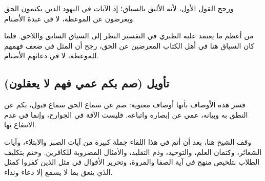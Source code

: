 ورجح القول الأول، لأنه الأليق بالسياق؛ إذ الآيات في اليهود الذين يكتمون الحق ويعرضون عن الموعظة، لا في عبدة الأصنام.

\begin{fawaid}
من أعظم ما يعتمد عليه الطبري في التفسير النظر إلى السياق السابق واللاحق. فلما كان السياق هنا في أهل الكتاب المعرضين عن الحق، رجح أن المثل في ضعف فهمهم للموعظة، لا في دعائهم الأصنام.
\end{fawaid}

\subsection{تأويل (صم بكم عمي فهم لا يعقلون)}
فسر  هذه الأوصاف بأنها أوصاف معنوية: صم عن سماع الحق سماع قبول، بكم عن النطق به وبيانه، عمي عن إبصاره واتباعه. فليست الآفة في الجوارح، وإنما في عدم الانتفاع بها.

\separator

وقف الشيخ هنا، بعد أن أتم في هذا اللقاء جملة كبيرة من آيات الصبر والابتلاء، وآيات الشعائر، وكتمان العلم، والتوحيد، وذم التقليد، والأمثال المضروبة للكافرين. وختم بتكليف الطلاب بتلخيص منهج  في آية الصفا والمروة، وتحرير الأقوال في مثل الذين كفروا كمثل الذي ينعق بما لا يسمع إلا دعاء ونداء.
